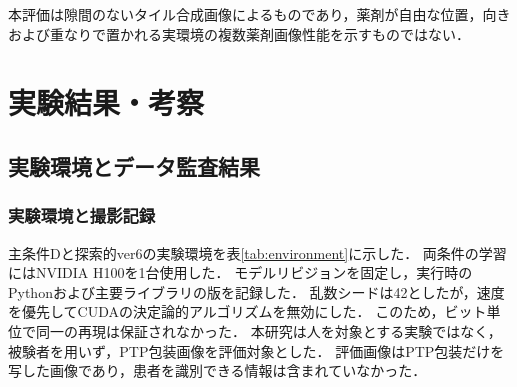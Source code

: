 \documentclass[uplatex,dvipdfmx]{jsarticle}
\begin{document}
本評価は隙間のないタイル合成画像によるものであり，薬剤が自由な位置，向きおよび重なりで置かれる実環境の複数薬剤画像性能を示すものではない．

\clearpage
\section{実験結果・考察}\label{sec:results}

\subsection{実験環境とデータ監査結果}\label{sec:env_data}

\subsubsection{実験環境と撮影記録}

主条件Dと探索的ver6の実験環境を表\ref{tab:environment}に示した．
両条件の学習にはNVIDIA H100を1台使用した．
モデルリビジョンを固定し，実行時のPythonおよび主要ライブラリの版を記録した．
乱数シードは42としたが，速度を優先してCUDAの決定論的アルゴリズムを無効にした．
このため，ビット単位で同一の再現は保証されなかった．
本研究は人を対象とする実験ではなく，被験者を用いず，PTP包装画像を評価対象とした．
評価画像はPTP包装だけを写した画像であり，患者を識別できる情報は含まれていなかった．
\end{document}
